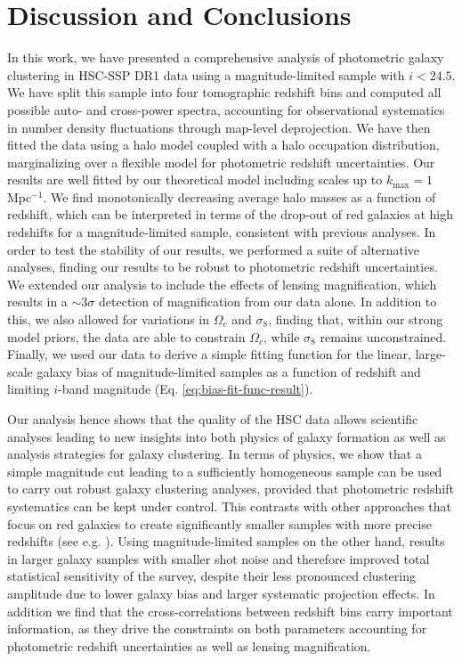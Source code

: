 \documentclass[a4paper,11pt]{article}
\begin{document}
\section{Discussion and Conclusions}\label{sec:discussion}
  In this work, we have presented a comprehensive analysis of photometric galaxy clustering in HSC-SSP DR1 data using a magnitude-limited sample with $i<24.5$. We have split this sample into four tomographic redshift bins and computed all possible auto- and cross-power spectra, accounting for observational systematics in number density fluctuations through map-level deprojection. We have then fitted the data using a halo model coupled with a halo occupation distribution, marginalizing over a flexible model for photometric redshift uncertainties. Our results are well fitted by our theoretical model including scales up to $k_{\mathrm{max}} = 1$ Mpc$^{-1}$. We find monotonically decreasing average halo masses as a function of redshift, which can be interpreted in terms of the drop-out of red galaxies at high redshifts for a magnitude-limited sample, consistent with previous analyses. In order to test the stability of our results, we performed a suite of alternative analyses, finding our results to be robust to photometric redshift uncertainties. We extended our analysis to include the effects of lensing magnification, which results in a $\sim 3 \sigma$ detection of magnification from our data alone. In addition to this, we also allowed for variations in $\Omega_{c}$ and $\sigma_{8}$, finding that, within our strong model priors, the data are able to constrain $\Omega_{c}$, while $\sigma_{8}$ remains unconstrained. Finally, we used our data to derive a simple fitting function for the linear, large-scale galaxy bias of magnitude-limited samples as a function of redshift and limiting $i$-band magnitude (Eq. \ref{eq:bias-fit-func-result}).

  Our analysis hence shows that the quality of the HSC data allows scientific analyses leading to new insights into both physics of galaxy formation as well as analysis strategies for galaxy clustering. In terms of physics, we show that a simple magnitude cut leading to a sufficiently homogeneous sample can be used to carry out robust galaxy clustering analyses, provided that photometric redshift systematics can be kept under control. This contrasts with other approaches that focus on red galaxies to create significantly smaller samples with more precise redshifts (see e.g. \cite{1507.05460,1807.10163}). Using magnitude-limited samples on the other hand, results in larger galaxy samples with smaller shot noise and therefore improved total statistical sensitivity of the survey, despite their less pronounced clustering amplitude due to lower galaxy bias and larger systematic projection effects. In addition we find that the cross-correlations between redshift bins carry important information, as they drive the constraints on both parameters accounting for photometric redshift uncertainties as well as lensing magnification.
\end{document}
